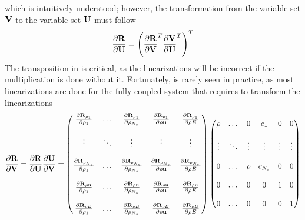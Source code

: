 which is intuitively understood; however, the transformation from the variable
set $\mathbf V$ to the variable set $\mathbf U$ must follow 
\begin{equation}
  \frac{\partial \mathbf R}{\partial \mathbf U} = \left( \frac{\partial \mathbf R}{\partial \mathbf V}^{T} \frac{\partial \mathbf V}{\partial \mathbf U}^{T} \right)^{T}
  \label{r-v-to-u}
\end{equation}
The transposition in  is critical, as the linearizations will be
incorrect if the multiplication is done without it.  Fortunately,
 is rarely seen in practice, as most linearizations are done for
the fully-coupled system that requires  to transform the
linearizations
\begin{equation}
  \begin{aligned}
    \frac{\partial \mathbf R}{\partial \mathbf V} = \frac{\partial \mathbf R}{\partial \mathbf U} \frac{\partial \mathbf U}{\partial \mathbf V} =
    \begin{pmatrix}
      \frac{\partial \mathbf R_{\rho_1}}{\partial \rho_1}    & \dots  & \frac{\partial \mathbf R_{\rho_1}}{\partial \rho_{N_s}}    & \frac{\partial \mathbf R_{\rho_1}}{\partial \rho \mathbf u}    & \frac{\partial \mathbf R_{\rho_1}}{\partial \rho E}    \\ \\
      \vdots                    & \ddots & \vdots                       & \vdots                      & \vdots                    \\ \\
      \frac{\partial \mathbf R_{\rho_{N_s}}}{\partial \rho_1} & \dots  & \frac{\partial \mathbf R_{\rho_{N_s}}}{\partial \rho_{N_s}} & \frac{\partial \mathbf R_{\rho_{N_s}}}{\partial \rho \mathbf u} & \frac{\partial \mathbf R_{\rho_{N_s}}}{\partial \rho E} \\ \\
      \frac{\partial \mathbf R_{\rho \mathbf u}}{\partial \rho_1}  & \dots  & \frac{\partial \mathbf R_{\rho \mathbf u}}{\partial \rho_{N_s}}  & \frac{\partial \mathbf R_{\rho \mathbf u}}{\partial \rho \mathbf u}  & \frac{\partial \mathbf R_{\rho \mathbf u}}{\partial \rho E}  \\ \\
      \frac{\partial \mathbf R_{\rho E}}{\partial \rho_1}    & \dots  & \frac{\partial \mathbf R_{\rho E}}{\partial \rho_{N_s}}    & \frac{\partial \mathbf R_{\rho E}}{\partial \rho \mathbf u}    & \frac{\partial \mathbf R_{\rho E}}{\partial \rho E}
    \end{pmatrix}
    \begin{pmatrix}
      \rho   & \dots  & 0      & c_1     & 0      & 0      \\ \\
      \vdots & \ddots & \vdots & \vdots  & \vdots & \vdots \\ \\
      0      & \dots  &\rho    & c_{N_s}  & 0      & 0      \\ \\
      0      & \dots  &0       & 0       & 1      & 0      \\ \\
      0      & \dots  &0       & 0       & 0      & 1
    \end{pmatrix}
  \end{aligned}
  \label{drdu-to-drdv}
\end{equation}
